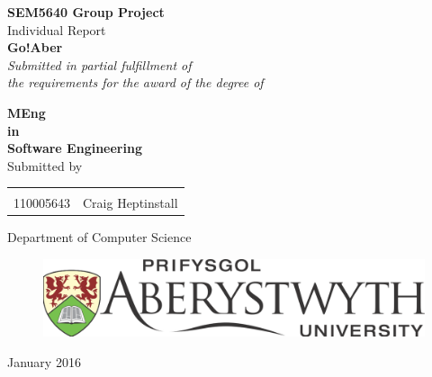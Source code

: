 \begin{titlepage}

\begin{center}

\textup{\small {\bf SEM5640 Group Project} \\ Individual Report}\\[0.2in]

\Large \textbf {Go!Aber}\\[0.5in]

       \small \emph{Submitted in partial fulfillment of\\
        the requirements for the award of the degree of}
        \vspace{.2in}

       {\bf MEng  \\in\\ Software Engineering}\\[0.5in]

\normalsize Submitted by \\
\begin{table}[h]
\centering
\begin{tabular}{lr}\hline \\
110005643 & Craig Heptinstall \\ \hline 
\end{tabular}
\end{table}

\vspace{.1in}

\Large{Department of Computer Science}\\
\vspace{.4in}
\normalsize
\begin{figure}[H]
\begin{center}
\includegraphics[scale=0.2]{images/Aberystwyth_University_logo.png} 
\end{center}
\end{figure}
January 2016

\end{center}

\end{titlepage}
